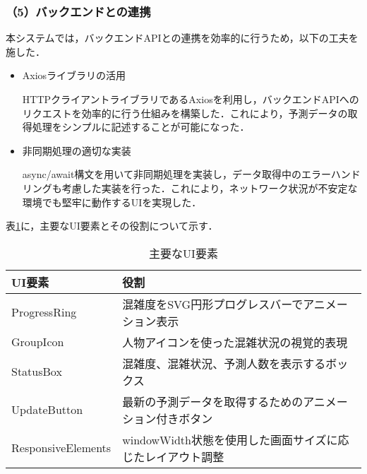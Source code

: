 \subsubsection*{（5）バックエンドとの連携}
本システムでは，バックエンドAPIとの連携を効率的に行うため，以下の工夫を施した．

\begin{itemize}
	\item Axiosライブラリの活用
	
	HTTPクライアントライブラリであるAxiosを利用し，バックエンドAPIへのリクエストを効率的に行う仕組みを構築した．これにより，予測データの取得処理をシンプルに記述することが可能になった．
	
	\item 非同期処理の適切な実装
	
	async/await構文を用いて非同期処理を実装し，データ取得中のエラーハンドリングも考慮した実装を行った．これにより，ネットワーク状況が不安定な環境でも堅牢に動作するUIを実現した．
\end{itemize}

表\ref{tbl:UI_components}に，主要なUI要素とその役割について示す．

\begin{table}[tb]
	\centering
	\caption{主要なUI要素}
	\label{tbl:UI_components}
	\small
	\doublerulesep=0.3pt
	\begin{tabular}{l|p{9cm}} \hline\hline\hline
		UI要素 & 役割 \\ \hline
		ProgressRing & 混雑度をSVG円形プログレスバーでアニメーション表示 \\ \hline
		GroupIcon & 人物アイコンを使った混雑状況の視覚的表現 \\ \hline
		StatusBox & 混雑度、混雑状況、予測人数を表示するボックス \\ \hline
		UpdateButton & 最新の予測データを取得するためのアニメーション付きボタン \\ \hline
		ResponsiveElements & windowWidth状態を使用した画面サイズに応じたレイアウト調整 \\ \hline\hline\hline
	\end{tabular}
\end{table}